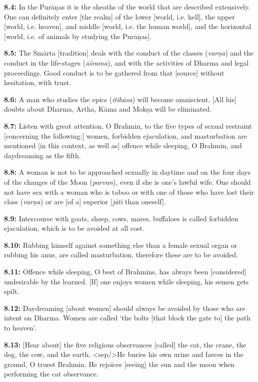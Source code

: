 \documentclass{article}
\newcommand{\vsnum}[1]{\textbf{#1}}
\newcommand{\skt}[1]{\textit{#1}}
\begin{document}
\vsnum{8.4: }In the Purāṇas it is the sheaths of the world that are described extensively. One can definitely enter [the realm] of the lower [world, i.e. hell], the upper [world, i.e. heaven], and middle [world, i.e. the human world], and the horizontal [world, i.e. of animals by studying the Purāṇas].

\vsnum{8.5: }The Smārta [tradition] deals with the conduct of the classes (\skt{varṇa}) and the conduct in the life-stages (\skt{āśrama}), and with the activities of Dharma and legal proceedings. Good conduct is to be gathered from that [source] without hesitation, with trust.

\vsnum{8.6: }A man who studies the epics (\skt{itihāsa}) will become omniscient. [All his] doubts about Dharma, Artha, Kāma and Mokṣa will be eliminated.

\vsnum{8.7: }Listen with great attention, O Brahmin, to the five types of sexual restraint [concerning the following:] women, forbidden ejaculation, and masturbation are mentioned [in this context, as well as] offence while sleeping, O Brahmin, and daydreaming as the fifth.

\vsnum{8.8: }A woman is not to be approached sexually in daytime and on the four days of the changes of the Moon (\skt{parvan}), even if she is one's lawful wife. One should not have sex with a woman who is taboo or with one of those who have lost their class (\skt{varṇa}) or are [of a] superior [\skt{jāti} than oneself].

\vsnum{8.9: }Intercourse with goats, sheep, cows, mares, buffaloes is called forbidden ejaculation, which is to be avoided at all cost.

\vsnum{8.10: }Rubbing himself against something else than a female sexual organ or rubbing his anus, are called masturbation, therefore these are to be avoided.

\vsnum{8.11: }Offence while sleeping, O best of Brahmins, has always been [considered] undesirable by the learned. [If] one enjoys women while sleeping, his semen gets spilt.

\vsnum{8.12: }Daydreaming [about women] should always be avoided by those who are intent on Dharma. Women are called `the bolts [that block the gate to] the path to heaven'.

\vsnum{8.13: }[Hear about] the five religious observances [called] the cat, the crane, the dog, the cow, and the earth. <sep/>He buries his own urine and faeces in the ground, O truest Brahmin. He rejoices [seeing] the sun and the moon when performing the cat observance.
\end{document}
